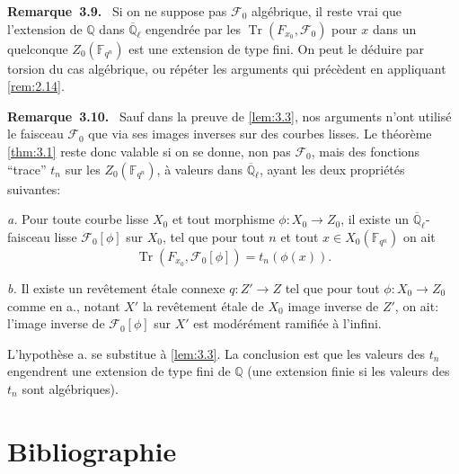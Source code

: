 \documentclass[11pt,a4paper]{article}
\makeatletter
\theoremstyle{plain}
\theoremstyle{definition}
\newenvironment{manualremark}[4]{%
  \par\medskip\noindent\textbf{#1~#2#3.}\def\@currentlabel{#2}\label{#4}\ }{\par\medskip}
\DeclareMathOperator{\tr}{Tr}
\makeatother
\begin{document}
\begin{manualremark}{Remarque}{3.9}{}{rem:3.9}
Si on ne suppose pas $\mathcal{F}_0$ alg\'ebrique, il reste vrai que l'extension de $\mathbb{Q}$ dans $\overline{\mathbb{Q}}_\ell$ engendr\'ee par les $\tr(F_{x_0}, \mathcal{F}_0)$ pour $x$ dans un quelconque $Z_0(\mathbb{F}_{q^n})$ est une extension de type fini. On peut le d\'eduire par torsion du cas alg\'ebrique, ou r\'ep\'eter les arguments qui pr\'ec\`edent en appliquant \ref{rem:2.14}.
\end{manualremark}

\begin{manualremark}{Remarque}{3.10}{}{rem:3.10}
Sauf dans la preuve de \ref{lem:3.3}, nos arguments n'ont utilis\'e le faisceau $\mathcal{F}_0$ que via ses images inverses sur des courbes lisses. Le th\'eor\`eme \ref{thm:3.1} reste donc valable si on se donne, non pas $\mathcal{F}_0$, mais des fonctions ``trace'' $t_n$ sur les $Z_0(\mathbb{F}_{q^n})$, \`a valeurs dans $\overline{\mathbb{Q}}_\ell$, ayant les deux propri\'et\'es suivantes:

\emph{a.} Pour toute courbe lisse $X_0$ et tout morphisme $\phi: X_0 \to Z_0$, il existe un $\overline{\mathbb{Q}}_\ell$-faisceau lisse $\mathcal{F}_0[\phi]$ sur $X_0$, tel que pour tout $n$ et tout $x \in X_0(\mathbb{F}_{q^n})$ on ait
\[
\tr(F_{x_0}, \mathcal{F}_0[\phi]) = t_n(\phi(x)).
\]

\emph{b.} Il existe un rev\^etement \'etale connexe $q: Z' \to Z$ tel que pour tout $\phi: X_0 \to Z_0$ comme en a., notant $X'$ la rev\^etement \'etale de $X_0$ image inverse de $Z'$, on ait: l'image inverse de $\mathcal{F}_0[\phi]$ sur $X'$ est mod\'er\'ement ramifi\'ee \`a l'infini.

L'hypoth\`ese a. se substitue \`a \ref{lem:3.3}. La conclusion est que les valeurs des $t_n$ engendrent une extension de type fini de $\mathbb{Q}$ (une extension finie si les valeurs des $t_n$ sont alg\'ebriques).
\end{manualremark}

\section*{Bibliographie}
\end{document}
